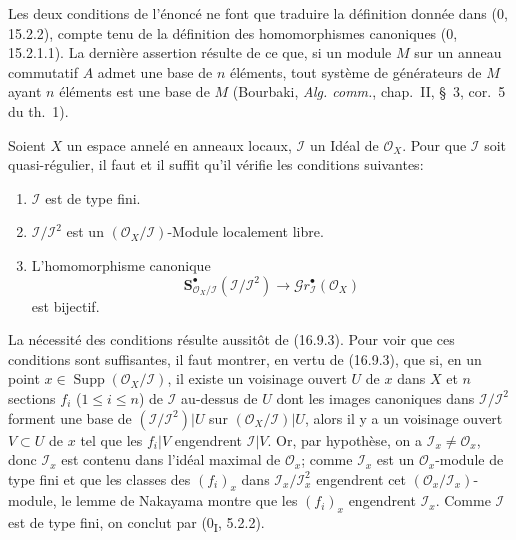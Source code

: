 
Les deux conditions de l'énoncé ne font que traduire la définition donnée dans
(0, 15.2.2), compte tenu de la définition des homomorphismes canoniques
(0, 15.2.1.1). La dernière assertion résulte de ce que, si un module $M$ sur
un anneau commutatif $A$ admet une base de $n$ éléments, tout système de
générateurs de $M$ ayant $n$ éléments est une base de $M$ (Bourbaki,
\emph{Alg. comm.}, chap.~II, §~3, cor.~5 du th.~1).

\begin{corollary}[16.9.4]
\label{IV.16.9.4}
Soient $X$ un espace annelé en anneaux locaux, $\mathscr{I}$ un Idéal de
$\mathcal{O}_X$. Pour que $\mathscr{I}$ soit quasi-régulier, il faut et il
suffit qu'il vérifie les conditions suivantes:
\begin{enumerate}
  \item[(i)] $\mathscr{I}$ est de type fini.
  \item[(ii)] $\mathscr{I}/\mathscr{I}^2$ est un
  $(\mathcal{O}_X/\mathscr{I})$-Module localement libre.
  \item[(iii)] L'homomorphisme canonique
  \[
    \mathbf{S}_{\mathcal{O}_X/\mathscr{I}}^{\bullet}
    (\mathscr{I}/\mathscr{I}^2)
    \longrightarrow\mathscr{G}r_{\mathscr{I}}^{\bullet}(\mathcal{O}_X)
    \tag{16.9.4.1}
    \label{IV.16.9.4.1}
  \]
  est bijectif.
\end{enumerate}
\end{corollary}

La nécessité des conditions résulte aussitôt de (16.9.3). Pour voir que ces
conditions sont suffisantes, il faut montrer, en vertu de (16.9.3), que si, en
un point $x\in\operatorname{Supp}(\mathcal{O}_X/\mathscr{I})$, il existe un
voisinage ouvert $U$ de $x$ dans $X$ et $n$ sections $f_i$ ($1\leq i\leq n$)
de $\mathscr{I}$ au-dessus de $U$ dont les images canoniques dans
$\mathscr{I}/\mathscr{I}^2$ forment une base de
$(\mathscr{I}/\mathscr{I}^2)|U$ sur
$(\mathcal{O}_X/\mathscr{I})|U$, alors il y a un voisinage ouvert
$V\subset U$ de $x$ tel que les $f_i|V$ engendrent $\mathscr{I}|V$. Or, par
hypothèse, on a $\mathscr{I}_x\neq\mathcal{O}_x$, donc $\mathscr{I}_x$ est
contenu dans l'idéal maximal de $\mathcal{O}_x$; comme $\mathscr{I}_x$ est un
$\mathcal{O}_x$-module de type fini et que les classes des $(f_i)_x$ dans
$\mathscr{I}_x/\mathscr{I}_x^2$ engendrent cet
$(\mathcal{O}_x/\mathscr{I}_x)$-module, le lemme de Nakayama montre que les
$(f_i)_x$ engendrent $\mathscr{I}_x$. Comme $\mathscr{I}$ est de type fini,
on conclut par (0\textsubscript{I}, 5.2.2).

